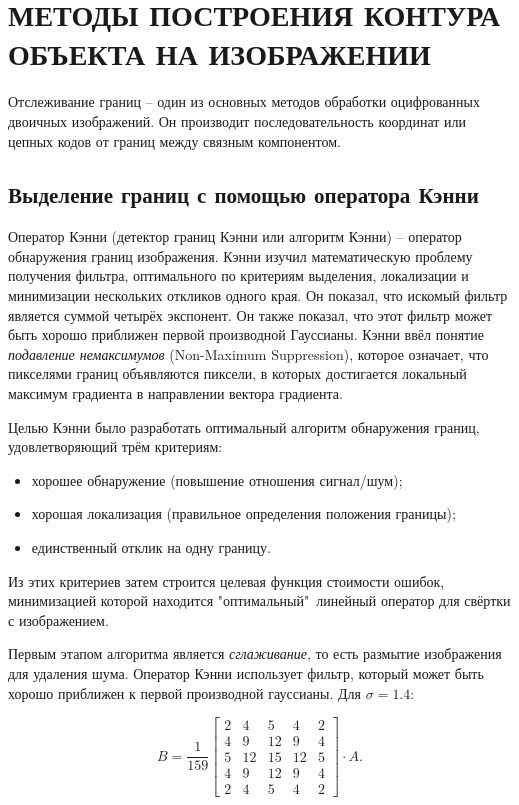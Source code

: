\section{\centering МЕТОДЫ ПОСТРОЕНИЯ КОНТУРА ОБЪЕКТА НА ИЗОБРАЖЕНИИ}

Отслеживание границ -- один из основных методов обработки оцифрованных
двоичных изображений. Он производит последовательность координат или 
цепных кодов от границ между связным компонентом.

\subsection{Выделение границ с помощью оператора Кэнни}

Оператор Кэнни (детектор границ Кэнни или алгоритм Кэнни) -- оператор
обнаружения границ изображения. Кэнни изучил математическую проблему
получения фильтра, оптимального по критериям выделения, локализации и
минимизации нескольких откликов одного края. Он показал, что искомый
фильтр является суммой четырёх экспонент. Он также показал, что этот
фильтр может быть хорошо приближен первой производной Гауссианы. Кэнни
ввёл понятие {\it подавление немаксимумов} (Non-Maximum Suppression), 
которое означает, что пикселями границ объявляются пиксели, в которых
достигается локальный максимум градиента в направлении вектора
градиента.

Целью Кэнни было разработать оптимальный алгоритм обнаружения границ, 
удовлетворяющий трём критериям:
\begin{itemize}
	\item хорошее обнаружение (повышение отношения сигнал/шум);
	\item хорошая локализация (правильное определения положения
границы);
	\item единственный отклик на одну границу.
\end{itemize}

Из этих критериев затем строится целевая функция стоимости ошибок, 
минимизацией которой находится "оптимальный"\ линейный оператор для
свёртки с изображением.

Первым этапом алгоритма является {\it сглаживание}, то есть размытие
изображения для удаления шума. Оператор Кэнни использует фильтр, 
который может быть хорошо приближен к первой производной гауссианы.
Для $\sigma=1.4$:

\begin{equation}
	B = \frac{1}{159}
\begin{bmatrix}
	2 & 4 & 5 & 4 & 2\\
	4 & 9 & 12 & 9 & 4\\
	5 & 12 & 15 & 12 & 5\\
	4 & 9 & 12 & 9 & 4\\
	2 & 4 & 5 & 4 & 2
\end{bmatrix}
\cdot A.
\label{canny-1}
\end{equation}

